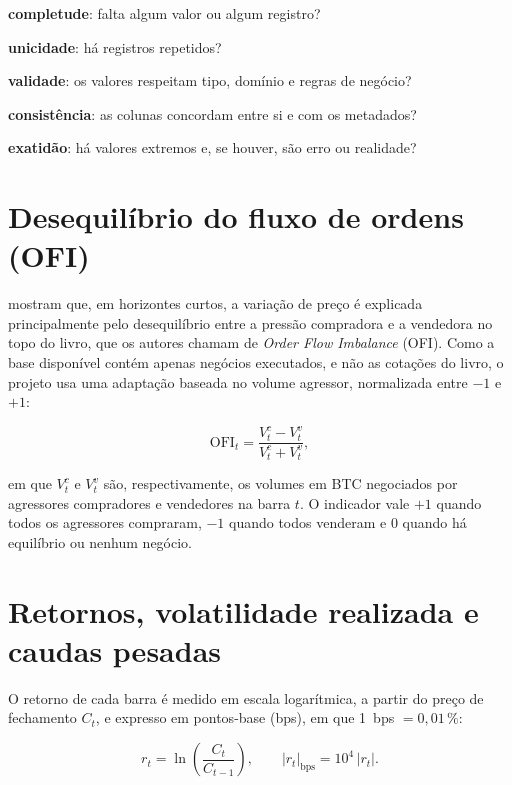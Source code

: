 \begin{alineas}
  \item \textbf{completude}: falta algum valor ou algum registro?
  \item \textbf{unicidade}: há registros repetidos?
  \item \textbf{validade}: os valores respeitam tipo, domínio e regras de negócio?
  \item \textbf{consistência}: as colunas concordam entre si e com os metadados?
  \item \textbf{exatidão}: há valores extremos e, se houver, são erro ou realidade?
\end{alineas}

\section{Desequilíbrio do fluxo de ordens (OFI)}\label{sec:ofi}

 mostram que, em horizontes curtos, a variação de preço é
explicada principalmente pelo desequilíbrio entre a pressão compradora e a
vendedora no topo do livro, que os autores chamam de \textit{Order Flow
Imbalance} (OFI). Como a base disponível contém apenas negócios executados, e
não as cotações do livro, o projeto usa uma adaptação baseada no volume
agressor, normalizada entre $-1$ e $+1$:

\begin{equation}\label{eq:ofi}
  \mathrm{OFI}_t = \frac{V_t^{c} - V_t^{v}}{V_t^{c} + V_t^{v}},
\end{equation}

\noindent em que $V_t^{c}$ e $V_t^{v}$ são, respectivamente, os volumes em BTC
negociados por agressores compradores e vendedores na barra $t$. O indicador
vale $+1$ quando todos os agressores compraram, $-1$ quando todos venderam e
$0$ quando há equilíbrio ou nenhum negócio.

\section{Retornos, volatilidade realizada e caudas pesadas}\label{sec:volatilidade}

O retorno de cada barra é medido em escala logarítmica, a partir do preço de
fechamento $C_t$, e expresso em pontos-base (bps), em que 1~bps $= 0,01\,\%$:

\begin{equation}\label{eq:retorno}
  r_t = \ln\!\left(\frac{C_t}{C_{t-1}}\right), \qquad
  |r_t|_{\mathrm{bps}} = 10^4\,|r_t|.
\end{equation}

